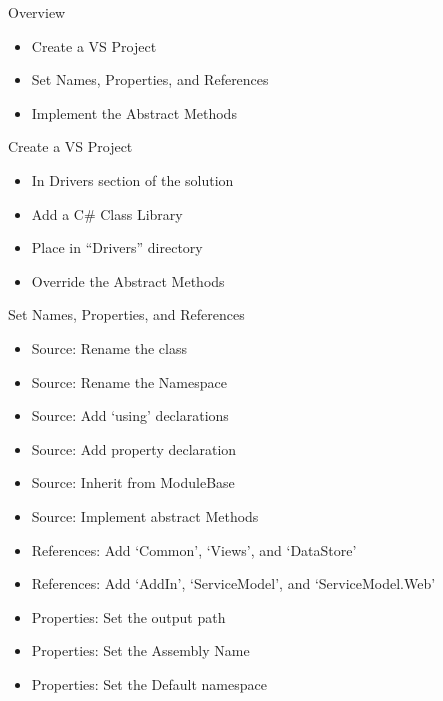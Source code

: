 \documentclass[11pt]{beamer}
\begin{document}
\begin{frame}{Overview}
    \begin{itemize}
        \item Create a VS Project
        \item Set Names, Properties, and References
        \item Implement the Abstract Methods
    \end{itemize}
\end{frame}

\begin{frame}{Create a VS Project}
    \begin{itemize}
        \item In Drivers section of the solution
        \item Add a C\# Class Library
        \item Place in ``Drivers'' directory
        \item Override the Abstract Methods
    \end{itemize}
\end{frame}

\begin{frame}{Set Names, Properties, and References}
    \begin{itemize}
        \item Source: Rename the class
        \item Source: Rename the Namespace
        \item Source: Add `using' declarations
        \item Source: Add property declaration
        \item Source: Inherit from ModuleBase
        \item Source: Implement abstract Methods
        \item References: Add `Common', `Views', and `DataStore'
        \item References: Add `AddIn', `ServiceModel', and `ServiceModel.Web'
        \item Properties: Set the output path
        \item Properties: Set the Assembly Name
        \item Properties: Set the Default namespace
    \end{itemize}
\end{frame}
\end{document}
